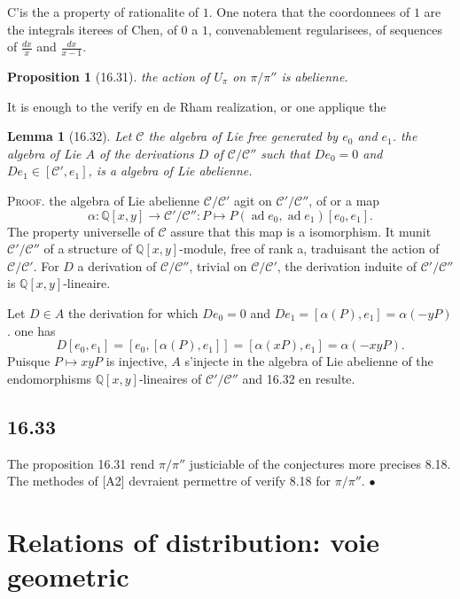 \documentclass[12pt,a4paper]{article}
\theoremstyle{plain}
\newtheorem{lemma}[theorem]{Lemma}
\newtheorem{proposition}[theorem]{Proposition}
\theoremstyle{definition}
\theoremstyle{remark}
\DeclareMathOperator{\ad}{ad}
\newcommand{\QQ}{\mathbb{Q}}
\begin{document}
C'is the a property of rationalite of $1$. One notera that the
coordonnees of $1$ are the integrals iterees of Chen, of $0$
a $1$, convenablement regularisees, of sequences of $\frac{dx}{x}$ and
$\frac{dx}{x-1}$.

\begin{proposition}[16.31]\label{prop:16.31}
the action of $U_\pi$ on $\pi/\pi''$ is abelienne.
\end{proposition}

It is enough to the verify en de Rham realization, or one applique
the

\begin{lemma}[16.32]\label{lem:16.32}
Let $\mathcal{C}$ the algebra of Lie free generated by $e_0$ and $e_1$.
the algebra of Lie $A$ of the derivations $D$ of $\mathcal{C}/\mathcal{C}''$
such that $De_0 = 0$ and $De_1 \in [\mathcal{C}',e_1]$, is a algebra
of Lie abelienne.
\end{lemma}

\noindent \textsc{Proof.} the algebra of Lie abelienne
$\mathcal{C}/\mathcal{C}'$ agit on $\mathcal{C}'/\mathcal{C}''$, of or
a map
\[
\alpha : \QQ[x,y] \to \mathcal{C}'/\mathcal{C}'' : P \mapsto P(\ad
e_0, \ad e_1)[e_0,e_1].
\]
The property universelle of $\mathcal{C}$ assure that this map
is a isomorphism. It munit $\mathcal{C}'/\mathcal{C}''$ of a structure
of $\QQ[x,y]$-module, free of rank a, traduisant the action of
$\mathcal{C}/\mathcal{C}'$. For $D$ a derivation of
$\mathcal{C}/\mathcal{C}''$, trivial on $\mathcal{C}/\mathcal{C}'$, the
derivation induite of $\mathcal{C}'/\mathcal{C}''$ is
$\QQ[x,y]$-lineaire.

Let $D \in A$ the derivation for which $De_0 = 0$ and
$De_1 = [\alpha(P), e_1] = \alpha(-yP)$. one has
\[
D[e_0,e_1] = [e_0, [\alpha(P),e_1]] = [\alpha(xP), e_1] =
\alpha(-xyP).
\]
Puisque $P \mapsto xyP$ is injective, $A$ s'injecte in the algebra of
Lie abelienne of the endomorphisms $\QQ[x,y]$-lineaires of
$\mathcal{C}'/\mathcal{C}''$ and 16.32 en resulte.

\subsection*{16.33}

The proposition 16.31 rend $\pi/\pi''$ justiciable of the conjectures more
precises 8.18. The methodes of [A2] devraient permettre of
verify 8.18 for $\pi/\pi''$. \hfill $\bullet$


\section{Relations of distribution: voie geometric}\label{sec:17}
\end{document}
